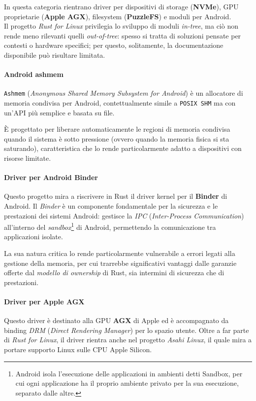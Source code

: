 In questa categoria rientrano driver per dispositivi di storage (\textbf{NVMe}), GPU proprietarie (\textbf{Apple AGX}), filesystem (\textbf{PuzzleFS}) e moduli per Android.\hfill
\vspace{7pt}\\
\noindent Il progetto \textit{Rust for Linux} privilegia lo sviluppo di moduli \textit{in-tree}, ma ciò non rende meno rilevanti quelli \textit{out-of-tree}:
spesso si tratta di soluzioni pensate per contesti o hardware specifici; per questo, solitamente, la documentazione disponibile può risultare limitata.

\paragraph{Android ashmem}
\texttt{Ashmem} (\textit{Anonymous Shared Memory Subsystem for Android}) è un allocatore di memoria condivisa per Android, contettualmente simile a 
\texttt{POSIX SHM} ma con un'API più semplice e basata su file.

È progettato per liberare automaticamente le regioni di memoria condivisa quando il sistema è sotto pressione (ovvero quando la memoria fisica si sta saturando), caratteristica che lo rende particolarmente 
adatto a dispositivi con risorse limitate.

\paragraph{Driver per Android Binder}
Questo progetto mira a riscrivere in Rust il driver kernel per il \textbf{Binder} di Android.
Il \textit{Binder} è un componente fondamentale per la sicurezza e le prestazioni dei sistemi Android: gestisce la \textit{IPC} (\textit{Inter-Process Communication}) all'interno 
del \textit{sandbox}\footnote{Android isola l'esecuzione delle applicazioni in ambienti detti Sandbox, per cui ogni applicazione ha il proprio ambiente privato per la sua esecuzione, separato dalle altre.} di Android, permettendo la comunicazione tra applicazioni isolate.

La sua natura critica lo rende particolarmente vulnerabile a errori legati alla gestione della memoria, per cui trarrebbe significativi vantaggi 
dalle garanzie offerte dal \textit{modello di ownership} di Rust, sia intermini di sicurezza che di prestazioni.

\paragraph{Driver per Apple AGX}
Questo driver è destinato alla GPU \textbf{AGX} di Apple ed è accompagnato da binding \textit{DRM} (\textit{Direct Rendering Manager}) per lo spazio utente.
Oltre a far parte di \textit{Rust for Linux}, il driver rientra anche nel progetto \textit{Asahi Linux}, il quale mira a portare supporto Linux sulle 
CPU Apple Silicon.

